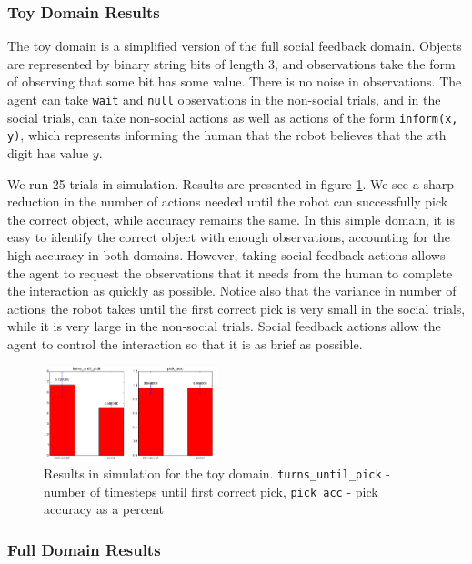 \documentclass{article}
\begin{document}
\begin{multicols}{2}
\subsubsection{Toy Domain Results}

The toy domain is a simplified version of the full social feedback domain. Objects are represented by binary string bits of length 3, and observations take the form of observing that some bit has some value. There is no noise in observations. The agent can take \texttt{wait} and \texttt{null} observations in the non-social trials, and in the social trials, can take non-social actions as well as actions of the form \texttt{inform(x, y)}, which represents informing the human that the robot believes that the $x$th digit has value $y$. 

We run 25 trials in simulation. Results are presented in figure \ref{fig:toyresults}. We see a sharp reduction in the number of actions needed until the robot can successfully pick the correct object, while accuracy remains the same. In this simple domain, it is easy to identify the correct object with enough observations, accounting for the high accuracy in both domains. However, taking social feedback actions allows the agent to request the observations that it needs from the human to complete the interaction as quickly as possible. Notice also that the variance in number of actions the robot takes until the first correct pick is very small in the social trials, while it is very large in the non-social trials. Social feedback actions allow the agent to control the interaction so that it is as brief as possible. 

\begin{figure}[H]
\begin{center}
	\includegraphics[width=0.45\textwidth]{toy_results}
\end{center}
\caption{Results in simulation for the toy domain. \texttt{turns\_until\_pick} - number of timesteps until first correct pick,  \texttt{pick\_acc} - pick accuracy as a percent}
	\label{fig:toyresults}
\end{figure}

\subsubsection{Full Domain Results}



\end{multicols}
\end{document}
